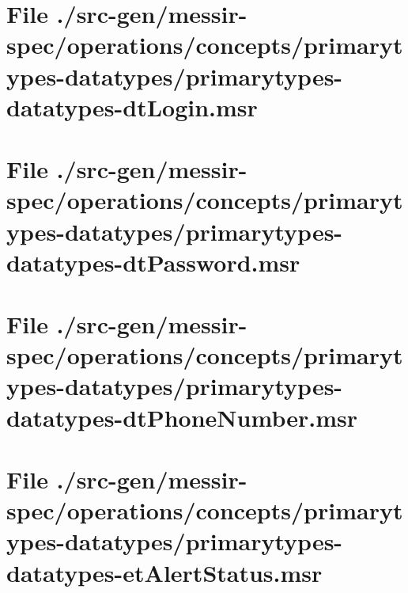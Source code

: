 \section[File /src-gen/messir-spec/operations.../primarytypes-datatypes-dtLogin.msr]{File ./src-gen/messir-spec/operations/concepts/primarytypes-datatypes/primarytypes-datatypes-dtLogin.msr}
\scriptsize

\normalsize
	
\section[File /src-gen/messir-spec/operations.../primarytypes-datatypes-dtPassword.msr]{File ./src-gen/messir-spec/operations/concepts/primarytypes-datatypes/primarytypes-datatypes-dtPassword.msr}
\scriptsize

\normalsize
	
\section[File /src-gen/messir-spec.../primarytypes-datatypes-dtPhoneNumber.msr]{File ./src-gen/messir-spec/operations/concepts/primarytypes-datatypes/primarytypes-datatypes-dtPhoneNumber.msr}
\scriptsize

\normalsize
	
\section[File /src-gen/messir-spec.../primarytypes-datatypes-etAlertStatus.msr]{File ./src-gen/messir-spec/operations/concepts/primarytypes-datatypes/primarytypes-datatypes-etAlertStatus.msr}
\scriptsize

\normalsize
	
